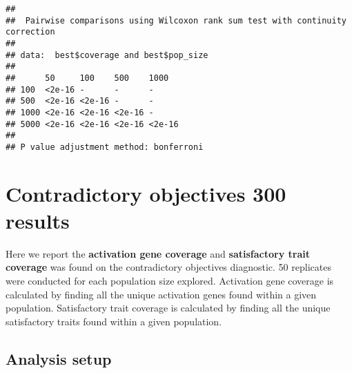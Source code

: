 \documentclass[
]{book}
\newenvironment{Shaded}{\begin{snugshade}}{\end{snugshade}}
\newcommand{\AttributeTok}[1]{\textcolor[rgb]{0.13,0.29,0.53}{#1}}
\newcommand{\CommentTok}[1]{\textcolor[rgb]{0.56,0.35,0.01}{\textit{#1}}}
\newcommand{\ConstantTok}[1]{\textcolor[rgb]{0.56,0.35,0.01}{#1}}
\newcommand{\FunctionTok}[1]{\textcolor[rgb]{0.13,0.29,0.53}{\textbf{#1}}}
\newcommand{\NormalTok}[1]{#1}
\newcommand{\OtherTok}[1]{\textcolor[rgb]{0.56,0.35,0.01}{#1}}
\newcommand{\SpecialCharTok}[1]{\textcolor[rgb]{0.81,0.36,0.00}{\textbf{#1}}}
\newcommand{\StringTok}[1]{\textcolor[rgb]{0.31,0.60,0.02}{#1}}
\begin{document}
\begin{verbatim}
## 
##  Pairwise comparisons using Wilcoxon rank sum test with continuity correction 
## 
## data:  best$coverage and best$pop_size 
## 
##      50     100    500    1000  
## 100  <2e-16 -      -      -     
## 500  <2e-16 <2e-16 -      -     
## 1000 <2e-16 <2e-16 <2e-16 -     
## 5000 <2e-16 <2e-16 <2e-16 <2e-16
## 
## P value adjustment method: bonferroni
\end{verbatim}

\hypertarget{contradictory-objectives-300-results}{%
\chapter{Contradictory objectives 300 results}\label{contradictory-objectives-300-results}}

Here we report the \textbf{activation gene coverage} and \textbf{satisfactory trait coverage} was found on the contradictory objectives diagnostic.
50 replicates were conducted for each population size explored.
Activation gene coverage is calculated by finding all the unique activation genes found within a given population.
Satisfactory trait coverage is calculated by finding all the unique satisfactory traits found within a given population.

\hypertarget{analysis-setup-4}{%
\section{Analysis setup}\label{analysis-setup-4}}

\begin{Shaded}
\end{Shaded}
\end{document}
